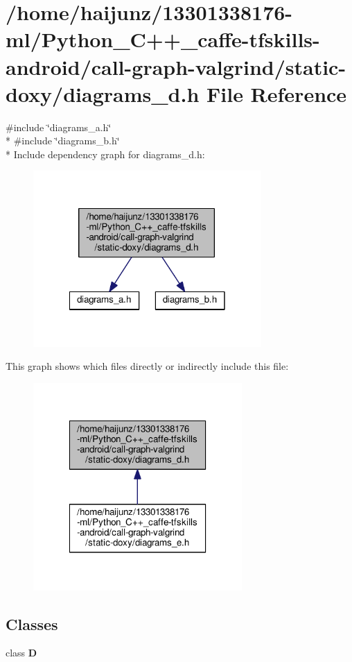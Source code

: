 \section{/home/haijunz/13301338176-\/ml/\-Python\-\_\-\-C++\-\_\-caffe-\/tfskills-\/android/call-\/graph-\/valgrind/static-\/doxy/diagrams\-\_\-d.h File Reference}
\label{diagrams__d_8h}
{\ttfamily \#include \char`\"{}diagrams\-\_\-a.\-h\char`\"{}}\\*
{\ttfamily \#include \char`\"{}diagrams\-\_\-b.\-h\char`\"{}}\\*
Include dependency graph for diagrams\-\_\-d.\-h\-:\nopagebreak
\begin{figure}[H]
\begin{center}
\leavevmode
\includegraphics[width=247pt]{diagrams__d_8h__incl}
\end{center}
\end{figure}
This graph shows which files directly or indirectly include this file\-:\nopagebreak
\begin{figure}[H]
\begin{center}
\leavevmode
\includegraphics[width=226pt]{diagrams__d_8h__dep__incl}
\end{center}
\end{figure}
\subsection*{Classes}
\begin{DoxyCompactItemize}
\item 
class {\bf D}
\end{DoxyCompactItemize}
